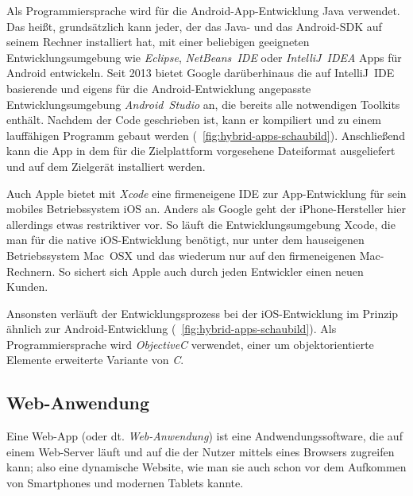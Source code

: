 Als Programmiersprache wird für die Android-App-Entwicklung Java verwendet. Das heißt, grundsätzlich kann jeder, der das Java- und das Android-SDK auf seinem Rechner installiert hat, mit einer beliebigen geeigneten Entwicklungsumgebung wie \emph{Eclipse}, \emph{NetBeans~IDE} oder \emph{IntelliJ~IDEA} Apps für Android entwickeln. 
Seit 2013 bietet Google darüberhinaus die auf IntelliJ~IDE basierende und eigens für die Android-Entwicklung angepasste Entwicklungsumgebung \emph{Android~Studio} an,\cite{android-studio} die bereits alle notwendigen Toolkits enthält. 
Nachdem der Code geschrieben ist, kann er kompiliert und zu einem lauffähigen Programm gebaut werden (\seename\ \autoref{fig:hybrid-apps-schaubild}). Anschließend kann die App in dem für die Zielplattform vorgesehene Dateiformat ausgeliefert und auf dem Zielgerät installiert werden.

Auch Apple bietet mit \emph{Xcode} eine firmeneigene IDE zur App-Entwicklung für sein mobiles Betriebssystem iOS an. Anders als Google geht der iPhone-Hersteller hier allerdings etwas restriktiver vor. So läuft die Entwicklungsumgebung Xcode, die man für die native iOS-Entwicklung benötigt, nur unter dem hauseigenen Betriebssystem Mac~OSX und das wiederum nur auf den firmeneigenen Mac-Rechnern. So sichert sich Apple auch durch jeden Entwickler einen neuen Kunden.

Ansonsten verläuft der Entwicklungsprozess bei der iOS-Entwicklung im Prinzip ähnlich zur Android-Entwicklung (\seename\ \autoref{fig:hybrid-apps-schaubild}).
Als Programmiersprache wird \emph{ObjectiveC} verwendet, einer um objektorientierte Elemente erweiterte Variante von \emph{C}.

\subsection{Web-Anwendung}

Eine Web-App (oder dt. \emph{Web-Anwendung}) ist eine Andwendungssoftware, die auf einem Web-Server läuft und auf die der Nutzer mittels eines Browsers zugreifen kann; also eine dynamische Website, wie man sie auch schon vor dem Aufkommen von Smartphones und modernen Tablets kannte. 

